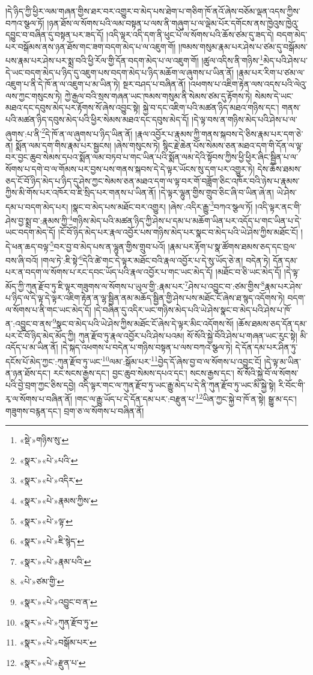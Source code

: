 །དེ་ཉིད་ཀྱི་ཕྱིར་ལམ་གཞན་གྱིས་ཐར་བར་འགྱུར་བ་མེད་པས་ཐེག་པ་གཅིག་ཁོ་ནའོ་ཞེས་བཅོམ་ལྡན་འདས་ཀྱིས་བཀའ་སྩལ་ཏོ། །ཉན་ཐོས་ལ་སོགས་པའི་ལམ་བསྟན་པ་ལས་ནི་གཞུག་པ་ལ་ལྡེམ་པོར་དགོངས་ནས་ཁྱེའུས་ཁྱེའུ་དབྱུང་བ་བཞིན་དུ་བསྟན་པར་ཟད་དོ། །འདི་ལྟར་འདི་དག་ནི་ཕུང་པོ་ལ་སོགས་པའི་ཆོས་ཙམ་དུ་ཟད་དེ། བདག་མེད་པར་བསྒོམས་ནས་ཉན་ཐོས་གང་ཟག་བདག་མེད་པ་ལ་འཇུག་གོ། །ཁམས་གསུམ་རྣམ་པར་ཤེས་པ་ཙམ་དུ་བསྒོམས་པས་རྣམ་པར་ཤེས་པར་སྨྲ་བའི་ཕྱི་རོལ་གྱི་དོན་བདག་མེད་པ་ལ་འཇུག་གོ། །ཚུལ་འདིས་ནི་གཉིས་\footnote{«སྡེ་»གཉིས་སུ་}མེད་པའི་ཤེས་པ་དེ་ཡང་བདག་མེད་པ་ཉིད་དུ་འཇུག་པས་བདག་མེད་པ་ཉིད་མཆོག་ལ་ཞུགས་པ་ཡིན་ནོ། །རྣམ་པར་རིག་པ་ཙམ་ལ་འཇུག་པ་ནི་དེ་ཁོ་ན་ལ་འཇུག་པ་མ་ཡིན་ཏེ། སྔར་བཤད་པ་བཞིན་ནོ། །འཕགས་པ་འཇིག་རྟེན་ལས་འདས་པའི་ལེའུ་ལས་ཀྱང་གསུངས་ཏེ། ཀྱེ་རྒྱལ་བའི་སྲས་གཞན་ཡང་ཁམས་གསུམ་ནི་སེམས་ཙམ་དུ་རྟོགས་ཏེ། སེམས་དེ་ཡང་མཐའ་དང་དབུས་མེད་པར་རྟོགས་སོ་ཞེས་འབྱུང་སྟེ། སྐྱེ་བ་དང་འཇིག་པའི་མཚན་ཉིད་མཐའ་གཉིས་དང་། གནས་པའི་མཚན་ཉིད་དབུས་མེད་པའི་ཕྱིར་སེམས་མཐའ་དང་དབུས་མེད་དོ། །དེ་ལྟ་བས་ན་གཉིས་མེད་པའི་ཤེས་པ་ལ་ཞུགས་:པ་ནི་\footnote{«སྣར་»«པེ་»པའི་}དེ་ཁོ་ན་ལ་ཞུགས་པ་ཉིད་ཡིན་ནོ། །རྣལ་འབྱོར་པ་རྣམས་ཀྱི་གནས་སྐབས་དེ་ཅིས་རྣམ་པར་དག་ཅེ་ན། སྨོན་ལམ་དག་གིས་རྣམ་པར་སྦྱངས། །ཞེས་གསུངས་ཏེ། སྙིང་རྗེ་ཆེན་པོས་སེམས་ཅན་མཐའ་དག་གི་དོན་ལ་ལྟ་བར་བྱང་ཆུབ་སེམས་དཔའ་སྨོན་ལམ་བཏབ་པ་གང་ཡིན་པའི་སྨོན་ལམ་དེའི་སྟོབས་ཀྱིས་ཕྱི་ཕྱིར་ཞིང་སྦྱིན་པ་ལ་སོགས་པ་དགེ་བ་ལ་གོམས་པར་བྱས་པས་གནས་སྐབས་དེ་དེ་ལྟར་ཡོངས་སུ་དག་པར་འགྱུར་ཏེ། དེས་ཆོས་ཐམས་ཅད་ངོ་བོ་ཉིད་མེད་པ་ཉིད་དུ་ཤེས་ཀྱང་སེམས་ཅན་མཐའ་དག་ལ་ལྟ་བར་གོ་བཟློག་ཅིང་འཁོར་བའི་ཉེས་པ་རྣམས་ཀྱིས་མི་གོས་པར་འཁོར་བ་ཇི་སྲིད་པར་གནས་པ་ཡིན་ནོ། །དེ་ལྟར་ལྷུན་གྱིས་གྲུབ་ཅིང་ཞི་བ་ཡིན་ཞེ་ན། ཡེ་ཤེས་དམ་པ་བདག་མེད་པར། །སྣང་བ་མེད་པས་མཐོང་བར་འགྱུར། །ཞེས་:འདིར་རྒྱུ་\footnote{«སྣར་»«པེ་»འདིར་}བཀའ་སྩལ་ཏོ། །འདི་ལྟར་ནང་གི་ཤེས་བྱ་སྨྲ་བ་:རྣམས་ཀྱི་\footnote{«སྣར་»«པེ་»རྣམས་ཀྱིས་}གཉིས་མེད་པའི་མཚན་ཉིད་ཀྱི་ཤེས་པ་དམ་པ་མཆོག་ཡིན་པར་འདོད་པ་གང་ཡིན་པ་དེ་ཡང་བདག་མེད་དོ། །ངོ་བོ་ཉིད་མེད་པར་རྣལ་འབྱོར་པས་གཉིས་མེད་པར་སྣང་བ་མེད་པའི་ཡེ་ཤེས་ཀྱིས་མཐོང་ངོ། །དེ་ཕན་ཆད་བལྟ་\footnote{«སྣར་»«པེ་»ལྟ་}བར་བྱ་བ་མེད་པས་ན་ལྷུན་གྱིས་གྲུབ་པའོ། །རྣམ་པར་རྟོག་པ་སྣ་ཚོགས་ཐམས་ཅད་དང་བྲལ་བས་ཞི་བའོ། །གལ་ཏེ་:ཇི་སྟེ་\footnote{«སྣར་»«པེ་»ཇི་སྙེད་}དེའི་ཚེ་གང་དེ་ལྟར་མཐོང་བའི་རྣལ་འབྱོར་པ་དེ་སུ་ཡོད་ཅེ་ན། བདེན་ཏེ། དོན་དམ་པར་ན་བདག་ལ་སོགས་པ་རང་དབང་ཡོད་པའི་རྣལ་འབྱོར་པ་གང་ཡང་མེད་དོ། །མཐོང་བ་ཅི་ཡང་མེད་དོ། །དེ་ལྟ་མོད་ཀྱི་ཀུན་རྫོབ་ཏུ་ཇི་ལྟར་གཟུགས་ལ་སོགས་པ་ཡུལ་གྱི་:རྣམ་པར་\footnote{«སྣར་»«པེ་»རྣམ་པའི་}ཤེས་པ་འབྱུང་བ་:ཙམ་གྱིས་\footnote{«པེ་»ཙམ་གྱི་}རྣམ་པར་ཤེས་པ་ཉིད་ལ་དེ་ལྟ་དེ་ལྟར་འཇིག་རྟེན་ན་ལྷ་སྦྱིན་ནམ་མཆོད་སྦྱིན་གྱི་ཤེས་པས་མཐོང་ངོ་ཞེས་ཐ་སྙད་འདོགས་ཏེ། བདག་ལ་སོགས་པ་ནི་གང་ཡང་མེད་དོ། །དེ་བཞིན་དུ་འདིར་ཡང་གཉིས་མེད་པའི་ཡེ་ཤེས་སྣང་བ་མེད་པའི་ཤེས་པ་ཁོ་ན་:འབྱུང་བ་ནས་\footnote{«སྣར་»«པེ་»འབྱུང་བ་ན་}སྣང་བ་མེད་པའི་ཡེ་ཤེས་ཀྱིས་མཐོང་ངོ་ཞེས་དེ་ལྟར་མིང་འདོགས་སོ། །ཆོས་ཐམས་ཅད་དོན་དམ་པར་ངོ་བོ་ཉིད་མེད་མོད་ཀྱི། ཀུན་རྫོབ་ཏུ་རྣལ་འབྱོར་པའི་ཤེས་པའམ། སོ་སོའི་སྐྱེ་བོའི་ཤེས་པ་གཞན་ཡང་རུང་སྟེ། མི་འདོད་པ་མ་ཡིན་ནོ། །དེ་སྐད་འཕགས་པ་བདེན་པ་གཉིས་བསྟན་པ་ལས་བཀའ་སྩལ་ཏེ། དེ་དོན་དམ་པར་ཤིན་ཏུ་དངོས་པོ་མེད་ཀྱང་:ཀུན་རྫོབ་ཏུ་ཡང་\footnote{«སྣར་»«པེ་»ཀུན་རྫོབ་ཏུ་}ལམ་:སྒོམ་པར་\footnote{«སྣར་»«པེ་»བསྒོམ་པར་}བྱེད་དོ་ཞེས་བྱ་བ་ལ་སོགས་པ་འབྱུང་ངོ། །དེ་ལྟ་མ་ཡིན་ན་ཉན་ཐོས་དང་། རང་སངས་རྒྱས་དང་། བྱང་ཆུབ་སེམས་དཔའ་དང་། སངས་རྒྱས་དང་། སོ་སོའི་སྐྱེ་བོ་ལ་སོགས་པའི་བྱེ་བྲག་ཀྱང་ཅིས་དབྱེ། འདི་ལྟར་གང་ལ་ཀུན་རྫོབ་ཏུ་ཡང་རྒྱུ་མེད་པ་དེ་ནི་ཀུན་རྫོབ་ཏུ་ཡང་མི་སྐྱེ་སྟེ། རི་བོང་གི་རྭ་ལ་སོགས་པ་བཞིན་ནོ། །གང་ལ་རྒྱུ་ཡོད་པ་དེ་དོན་དམ་པར་:བརྫུན་པ་\footnote{«སྣར་»«པེ་»རྫུན་པ་}ཡིན་ཀྱང་སྐྱེ་བ་ཁོ་ན་སྟེ། སྒྱུ་མ་དང་། གཟུགས་བརྙན་དང་། བྲག་ཅ་ལ་སོགས་པ་བཞིན་ནོ། 